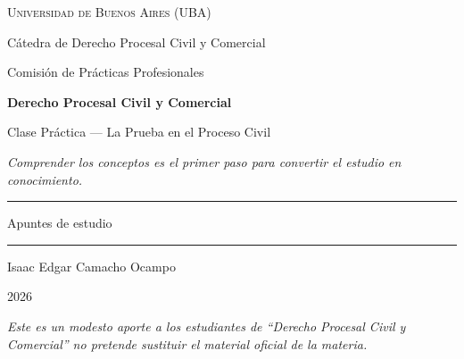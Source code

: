 \documentclass[12pt,oneside]{book}
\newcommand{\universidad}{Universidad de Buenos Aires (UBA)}
\newcommand{\catedra}{Cátedra de Derecho Procesal Civil y Comercial}
\newcommand{\comision}{Comisión de Prácticas Profesionales}
\newcommand{\materia}{Derecho Procesal Civil y Comercial}
\newcommand{\titulo}{Clase Práctica --- La Prueba en el Proceso Civil}
\newcommand{\autor}{Isaac Edgar Camacho Ocampo}
\newcommand{\anio}{2026}
\begin{document}
\begin{titlepage}

\thispagestyle{empty}

\begin{center}

\vspace*{1cm}

{\large \textsc{\universidad}}

\vspace{0.2cm}

{\large \catedra}

\vspace{0.2cm}

{\large \comision}

\vspace{3cm}

{\Huge \textbf{\materia}}

\vspace{1cm}

{\LARGE \titulo}

\vspace{0.8cm}

\textit{Comprender los conceptos es el primer paso para convertir el estudio en conocimiento.}

\vspace{1.2cm}

\rule{0.70\textwidth}{0.5pt}

\vspace{0.5cm}

{\large Apuntes de estudio}

\vspace{0.5cm}

\rule{0.70\textwidth}{0.5pt}

\vfill

{\large \autor}

\vspace{0.3cm}

{\large \anio}

\end{center}

\vfill

\begin{flushleft}
\textit{Este es un modesto aporte a los estudiantes de ``\materia'' no pretende sustituir el material oficial de la materia.}
\end{flushleft}

\end{titlepage}
\end{document}
